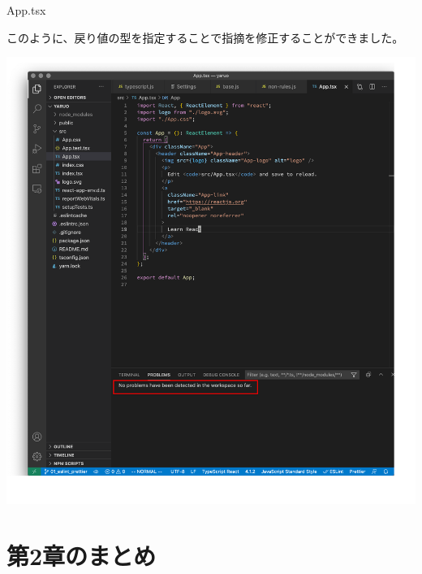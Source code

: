 \def\startercodeblockfontsize{}
\begin{starterprogram}[]{App.tsx}\end{starterprogram}

このように、戻り値の型を指定することで指摘を修正することができました。

\begin{reviewimage}[H]%
\includegraphics[width=1.0\maxwidth]{./images/02-create-react-app/06_eslint_prettier_fixdoneAll.png}%
\label{image:02-create-react-app:06_eslint_prettier_fixdoneAll}
\end{reviewimage}

\section{第2章のまとめ}
\keeplastskip{
  \label{sec:2-5}
  \label{sec-chap02review}
  \par\nobreak
}


